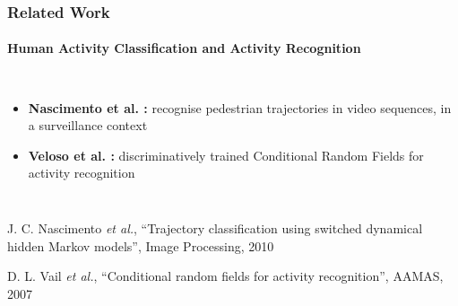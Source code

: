 \begin{frame}
	\frametitle{Related Work}
	\framesubtitle{Human Activity Classification and Activity Recognition}
	
	\normalsize
	
	\vspace{0.4cm}
	
	\begin{columns}[T]
		
		\vspace{0.2cm}
		
		\begin{itemize}
			\item \textbf{Nascimento {et al.} \cite{Nascimento10}:} recognise pedestrian trajectories in
				  video sequences, in a surveillance context
			
			\vspace{1.2cm}
			
			\item \textbf{Veloso {et al.} \cite{Vail07}:} discriminatively trained Conditional Random
				  Fields for activity recognition
		\end{itemize}
		
		
		\centering
	\end{columns}
	
	\vspace{0.47cm}
	
	\tiny
	
	\cite{Nascimento10} J. C. Nascimento \emph{et al.}, ``Trajectory classification using switched
	dynamical hidden Markov models'', Image Processing, 2010
	
	\cite{Vail07} D. L. Vail \emph{et al.}, ``Conditional random fields for activity recognition'',
	AAMAS, 2007 \\
\end{frame}

